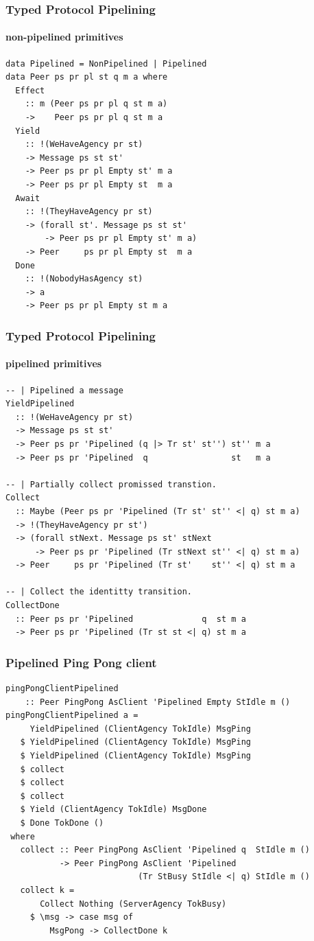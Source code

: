 \documentclass[t,dvipsnames]{beamer}
\begin{document}
\begin{frame}[fragile]
  \frametitle{Typed Protocol Pipelining}
  \framesubtitle{non-pipelined primitives}
  \begin{verbatim}
data Pipelined = NonPipelined | Pipelined
data Peer ps pr pl st q m a where
  Effect
    :: m (Peer ps pr pl q st m a)
    ->    Peer ps pr pl q st m a
  Yield
    :: !(WeHaveAgency pr st)
    -> Message ps st st'
    -> Peer ps pr pl Empty st' m a
    -> Peer ps pr pl Empty st  m a
  Await
    :: !(TheyHaveAgency pr st)
    -> (forall st'. Message ps st st'
        -> Peer ps pr pl Empty st' m a)
    -> Peer     ps pr pl Empty st  m a
  Done
    :: !(NobodyHasAgency st)
    -> a
    -> Peer ps pr pl Empty st m a
  \end{verbatim}
\end{frame}

\begin{frame}[fragile]
  \frametitle{Typed Protocol Pipelining}
  \framesubtitle{pipelined primitives}
  \begin{verbatim}
-- | Pipelined a message
YieldPipelined
  :: !(WeHaveAgency pr st)
  -> Message ps st st'
  -> Peer ps pr 'Pipelined (q |> Tr st' st'') st'' m a
  -> Peer ps pr 'Pipelined  q                 st   m a

-- | Partially collect promissed transtion.
Collect
  :: Maybe (Peer ps pr 'Pipelined (Tr st' st'' <| q) st m a)
  -> !(TheyHaveAgency pr st')
  -> (forall stNext. Message ps st' stNext
      -> Peer ps pr 'Pipelined (Tr stNext st'' <| q) st m a)
  -> Peer     ps pr 'Pipelined (Tr st'    st'' <| q) st m a

-- | Collect the identitty transition.
CollectDone
  :: Peer ps pr 'Pipelined              q  st m a
  -> Peer ps pr 'Pipelined (Tr st st <| q) st m a
  \end{verbatim}
\end{frame}

\begin{frame}[fragile]
  \frametitle{Pipelined Ping Pong client}
  \begin{verbatim}
pingPongClientPipelined
    :: Peer PingPong AsClient 'Pipelined Empty StIdle m ()
pingPongClientPipelined a =
     YieldPipelined (ClientAgency TokIdle) MsgPing
   $ YieldPipelined (ClientAgency TokIdle) MsgPing
   $ YieldPipelined (ClientAgency TokIdle) MsgPing
   $ collect
   $ collect
   $ collect
   $ Yield (ClientAgency TokIdle) MsgDone
   $ Done TokDone ()
 where
   collect :: Peer PingPong AsClient 'Pipelined q  StIdle m ()
           -> Peer PingPong AsClient 'Pipelined
                           (Tr StBusy StIdle <| q) StIdle m ()
   collect k =
       Collect Nothing (ServerAgency TokBusy)
     $ \msg -> case msg of
         MsgPong -> CollectDone k
  \end{verbatim}
\end{frame}
\end{document}
